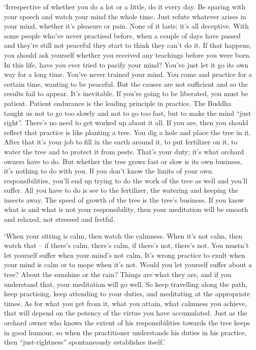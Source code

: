 `Irrespective of whether you do a lot or a little, do it every day. Be
sparing with your speech and watch your mind the whole time. Just refute
whatever arises in your mind, whether it's pleasure or pain. None of it
lasts; it's all deceptive. With some people who've never practised
before, when a couple of days have passed and they're still not peaceful
they start to think they can't do it. If that happens, you should ask
yourself whether you received any teachings before you were born. In
this life, have you ever tried to pacify your mind? You've just let it
go its own way for a long time. You've never trained your mind. You come
and practice for a certain time, wanting to be peaceful. But the causes
are not sufficient and so the results fail to appear. It's inevitable. 
If you're going to be liberated, you must be patient. Patient endurance
is the leading principle in practice. The Buddha taught us not to go too
slowly and not to go too fast, but to make the mind ``just right''. 
There's no need to get worked up about it all. If you are, then you
should reflect that practice is like planting a tree. You dig a hole and
place the tree in it. After that it's your job to fill in the earth
around it, to put fertilizer on it, to water the tree and to protect it
from pests. That's your duty; it's what orchard owners have to do. But
whether the tree grows fast or slow is its own business, it's nothing to
do with you. If you don't know the limits of your own responsibilities, 
you'll end up trying to do the work of the tree as well and you'll
suffer. All you have to do is see to the fertilizer, the watering and
keeping the insects away. The speed of growth of the tree is the tree's
business. If you know what is and what is not your responsibility, then
your meditation will be smooth and relaxed, not stressed and fretful. 

`When your sitting is calm, then watch the calmness. When it's not calm, 
then watch that -- if there's calm, there's calm, if there's not, 
there's not. You mustn't let yourself suffer when your mind's not calm. 
It's wrong practice to exult when your mind is calm or to mope when it's
not. Would you let yourself suffer about a tree? About the sunshine or
the rain? Things are what they are, and if you understand that, your
meditation will go well. So keep travelling along the path, keep
practising, keep attending to your duties, and meditating at the
appropriate times. As for what you get from it, what you attain, what
calmness you achieve, that will depend on the potency of the virtue you
have accumulated. Just as the orchard owner who knows the extent of his
responsibilities towards the tree keeps in good humour, so when the
practitioner understands his duties in his practice, then
``just-rightness'' spontaneously establishes itself.'

